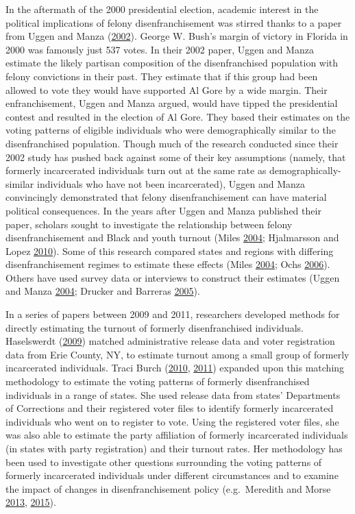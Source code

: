 \documentclass[12pt,]{article}
\begin{document}
In the aftermath of the 2000 presidential election, academic interest in the political implications of felony disenfranchisement was stirred thanks to a paper from Uggen and Manza (\protect\hyperlink{ref-Uggen2002}{2002}). George W. Bush's margin of victory in Florida in 2000 was famously just 537 votes. In their 2002 paper, Uggen and Manza estimate the likely partisan composition of the disenfranchised population with felony convictions in their past. They estimate that if this group had been allowed to vote they would have supported Al Gore by a wide margin. Their enfranchisement, Uggen and Manza argued, would have tipped the presidential contest and resulted in the election of Al Gore. They based their estimates on the voting patterns of eligible individuals who were demographically similar to the disenfranchised population. Though much of the research conducted since their 2002 study has pushed back against some of their key assumptions (namely, that formerly incarcerated individuals turn out at the same rate as demographically-similar individuals who have not been incarcerated), Uggen and Manza convincingly demonstrated that felony disenfranchisement can have material political consequences. In the years after Uggen and Manza published their paper, scholars sought to investigate the relationship between felony disenfranchisement and Black and youth turnout (Miles \protect\hyperlink{ref-Miles2004}{2004}; Hjalmarsson and Lopez \protect\hyperlink{ref-Hjalmarsson2010}{2010}). Some of this research compared states and regions with differing disenfranchisement regimes to estimate these effects (Miles \protect\hyperlink{ref-Miles2004}{2004}; Ochs \protect\hyperlink{ref-Ochs2006}{2006}). Others have used survey data or interviews to construct their estimates (Uggen and Manza \protect\hyperlink{ref-Uggen2004}{2004}; Drucker and Barreras \protect\hyperlink{ref-Drucker2005}{2005}).

In a series of papers between 2009 and 2011, researchers developed methods for directly estimating the turnout of formerly disenfranchised individuals. Haselswerdt (\protect\hyperlink{ref-Haselswerdt2009}{2009}) matched administrative release data and voter registration data from Erie County, NY, to estimate turnout among a small group of formerly incarcerated individuals. Traci Burch (\protect\hyperlink{ref-Burch2010}{2010}, \protect\hyperlink{ref-Burch2011}{2011}) expanded upon this matching methodology to estimate the voting patterns of formerly disenfranchised individuals in a range of states. She used release data from states' Departments of Corrections and their registered voter files to identify formerly incarcerated individuals who went on to register to vote. Using the registered voter files, she was also able to estimate the party affiliation of formerly incarcerated individuals (in states with party registration) and their turnout rates. Her methodology has been used to investigate other questions surrounding the voting patterns of formerly incarcerated individuals under different circumstances and to examine the impact of changes in disenfranchisement policy (e.g.~Meredith and Morse \protect\hyperlink{ref-Meredith2013}{2013}, \protect\hyperlink{ref-Meredith2015}{2015}).
\end{document}
